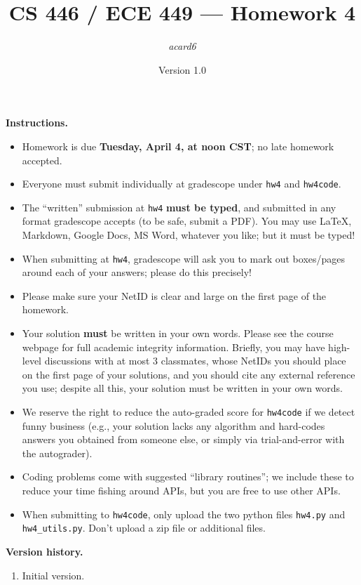 \documentclass{article}
\title{CS 446 / ECE 449 --- Homework 4}
\author{\emph{acard6}}
\date{Version 1.0}
\theoremstyle{definition}
\theoremstyle{remark}
\begin{document}
  \maketitle

  \noindent\textbf{Instructions.}
  \begin{itemize}
    \item
      Homework is due \textbf{Tuesday, April 4, at noon CST}; no late homework accepted.

    \item
      Everyone must submit individually at gradescope under \texttt{hw4} and \texttt{hw4code}.

    \item
      The ``written'' submission at \texttt{hw4} \textbf{must be typed}, and submitted in
      any format gradescope accepts (to be safe, submit a PDF).  You may use \LaTeX, Markdown,
      Google Docs, MS Word, whatever you like; but it must be typed!

    \item
      When submitting at \texttt{hw4}, gradescope will ask you to mark out boxes/pages
      around each of your answers; please do this precisely!

    \item
      Please make sure your NetID is clear and large on the first page of the homework.

    \item
      Your solution \textbf{must} be written in your own words.
      Please see the course webpage for full academic integrity information.
      Briefly, you may have high-level discussions with at most 3 classmates,
      whose NetIDs you should place on the first page of your solutions,
      and you should cite any external reference you use; despite all this,
      your solution must be written in your own words.

    \item
      We reserve the right to reduce the auto-graded score for
      \texttt{hw4code} if we detect funny business (e.g., your solution
      lacks any algorithm and hard-codes answers you obtained from
      someone else, or simply via trial-and-error with the autograder).

    \item
      Coding problems come with suggested ``library routines''; we include these to reduce
      your time fishing around APIs, but you are free to use other APIs.

    \item
      When submitting to \texttt{hw4code}, only upload the two python files \texttt{hw4.py} and \texttt{hw4\_utils.py}. Don't upload a zip file or additional files.

  \end{itemize}
  \noindent\textbf{Version history.}
  \begin{enumerate}
    \item Initial version.
  \end{enumerate}
\end{document}
